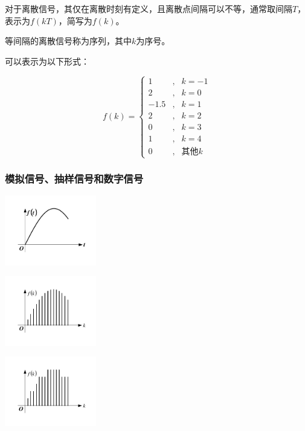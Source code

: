 对于离散信号，其仅在离散时刻有定义，且离散点间隔可以不等，通常取间隔$T$，表示为$f(kT)$，简写为$f(k)$。

等间隔的离散信号称为序列，其中$k$为序号。

可以表示为以下形式：

\begin{equation}
    f(k)=\left\{
    \begin{aligned}
        1    & , & k=-1         \\
        2    & , & k=0          \\
        -1.5 & , & k=1          \\
        2    & , & k=2          \\
        0    & , & k=3          \\
        1    & , & k=4          \\
        0    & , & \text{其他}k
    \end{aligned}
    \right.
\end{equation}

\subsubsection{模拟信号、抽样信号和数字信号}

\begin{Figure}[模拟、抽样、数字信号]
    \begin{FigureSub}[模拟信号]
        \includegraphics[width=40mm]{visio/1.4-a.pdf}
    \end{FigureSub}
    \begin{FigureSub}[抽样后信号]
        \includegraphics[width=40mm]{visio/1.4-b.pdf}
    \end{FigureSub}
    \begin{FigureSub}[数字信号]
        \includegraphics[width=40mm]{visio/1.4-c.pdf}
    \end{FigureSub}
\end{Figure}

